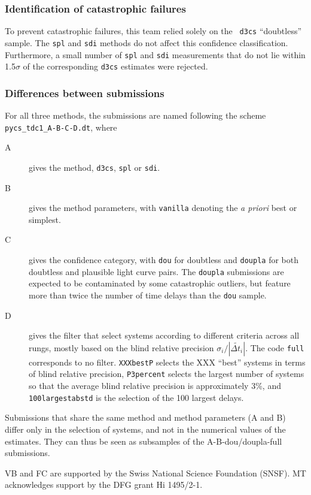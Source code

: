 \documentclass[traditabstract]{aa}
\begin{document}
\subsubsection{Identification of catastrophic failures}

To prevent catastrophic failures, this team relied solely on the {\tt
d3cs} ``doubtless'' sample. The {\tt spl} and {\tt sdi} methods do not
affect this confidence classification. Furthermore, a small number of
{\tt spl} and {\tt sdi} measurements that do not lie within 1.5$\sigma$
of the corresponding {\tt d3cs} estimates were rejected.

\subsubsection{Differences between submissions}

For all three methods, the submissions are named following the
scheme {\tt pycs\_tdc1\_A-B-C-D.dt}, where
\begin{description}
\item[A] gives the method, {\tt d3cs}, {\tt spl} or {\tt sdi}.
\item[B] gives the method parameters, with {\tt vanilla} denoting the \emph{a priori} best or simplest.
\item[C] gives the confidence category, with {\tt dou} for doubtless and {\tt doupla} for both doubtless and plausible light curve pairs. The {\tt doupla} submissions are expected to be contaminated by some catastrophic outliers, but feature more than twice the number of time delays than the {\tt dou} sample.
\item[D] gives the filter that select systems according to different criteria across all rungs, mostly based on the
blind relative precision $\sigma_i / |\widetilde{\Delta t_i}|$. The code {\tt full} corresponds to no filter. {\tt XXXbestP} selects the XXX ``best'' systems in terms of blind relative precision, {\tt P3percent} selects the largest number of systems so that the average blind relative precision is approximately 3\%, and {\tt 100largestabstd} is the selection of the 100 largest delays.
\end{description}

Submissions that share the same method and method parameters (A and B) differ only in the selection of systems, and not in the numerical values of the estimates. They can thus be seen as subsamples of the A-B-dou/doupla-full submissions.





\begin{acknowledgements}
VB and FC are supported by the Swiss National Science Foundation (SNSF). MT acknowledges support by the DFG grant Hi 1495/2-1.
\end{acknowledgements}





\end{document}
